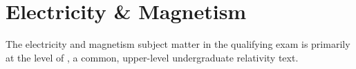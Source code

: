 \newpage
\chapter{Electricity \& Magnetism}
\label{sec:electro}
The electricity and magnetism subject matter in the qualifying exam is primarily at the level of \cite{griffithsIntroductionElectrodynamics2018}, a common, upper-level undergraduate relativity text.

